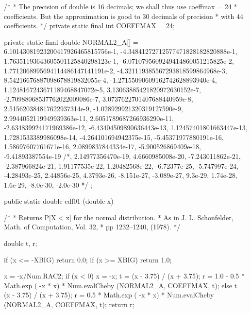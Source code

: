 \begin{code}\begin{hide}
  /*
    * The precision of double is 16 decimals; we shall thus use coeffmax = 24
    * coefficients. But the approximation is good to 30 decimals of precision
    * with 44 coefficients.
    */
   private static final int COEFFMAX = 24;

   private static final double NORMAL2_A[] = {
    6.10143081923200417926465815756e-1,
    -4.34841272712577471828182820888e-1,
    1.76351193643605501125840298123e-1,
    -6.0710795609249414860051215825e-2,
    1.7712068995694114486147141191e-2,
    -4.321119385567293818599864968e-3,
    8.54216676887098678819832055e-4,
    -1.27155090609162742628893940e-4,
    1.1248167243671189468847072e-5,
    3.13063885421820972630152e-7,
    -2.70988068537762022009086e-7,
    3.0737622701407688440959e-8,
    2.515620384817622937314e-9,
    -1.028929921320319127590e-9,
    2.9944052119949939363e-11,
    2.6051789687266936290e-11,
    -2.634839924171969386e-12,
    -6.43404509890636443e-13,
    1.12457401801663447e-13,
    1.7281533389986098e-14,
    -4.264101694942375e-15,
    -5.45371977880191e-16,
    1.58697607761671e-16,
    2.0899837844334e-17,
    -5.900526869409e-18,
   -9.41893387554e-19
/*,     2.14977356470e-19,
    4.6660985008e-20,
    -7.243011862e-21,
    -2.387966824e-21,
    1.91177535e-22,
    1.20482568e-22,
    -6.72377e-25,
    -5.747997e-24,
    -4.28493e-25,
    2.44856e-25,
    4.3793e-26,
    -8.151e-27,
    -3.089e-27,
    9.3e-29,
    1.74e-28,
    1.6e-29,
    -8.0e-30,
    -2.0e-30
*/
   };
\end{hide}

   public static double cdf01 (double x)\begin{hide} {
   /*
    * Returns P[X < x] for the normal distribution.
    * As in J. L. Schonfelder, Math. of Computation, Vol. 32,
    * pp 1232--1240, (1978).
    */

      double t, r;

      if (x <= -XBIG)
         return 0.0;
      if (x >= XBIG)
         return 1.0;

      x = -x/Num.RAC2;
      if (x < 0) {
         x = -x;
         t = (x - 3.75) / (x + 3.75);
         r = 1.0 - 0.5 * Math.exp ( -x * x) * Num.evalCheby (NORMAL2_A, COEFFMAX, t);
      } else {
         t = (x - 3.75) / (x + 3.75);
         r = 0.5 * Math.exp ( -x * x) * Num.evalCheby (NORMAL2_A, COEFFMAX, t);
      }
      return r;
   }\end{hide}
\end{code}
